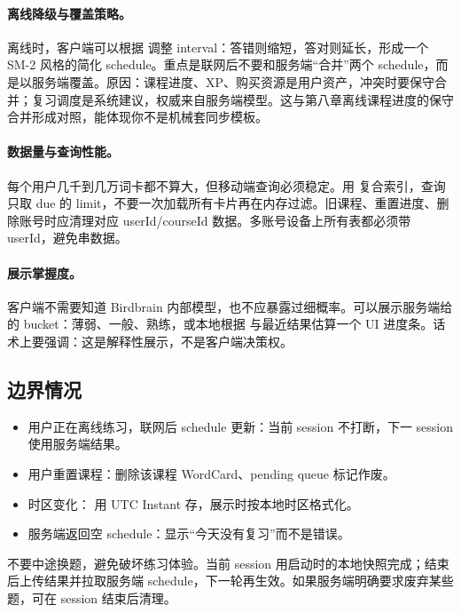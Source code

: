 \paragraph{离线降级与覆盖策略。} 离线时，客户端可以根据  调整 interval：答错则缩短，答对则延长，形成一个 SM-2 风格的简化 schedule。重点是联网后不要和服务端“合并”两个 schedule，而是以服务端覆盖。原因：课程进度、XP、购买资源是用户资产，冲突时要保守合并；复习调度是系统建议，权威来自服务端模型。\srcinferred 这与第八章离线课程进度的保守合并形成对照，能体现你不是机械套同步模板。

\paragraph{数据量与查询性能。} 每个用户几千到几万词卡都不算大，但移动端查询必须稳定。\srcinferred 用  复合索引，查询只取 due 的 limit，不要一次加载所有卡片再在内存过滤。旧课程、重置进度、删除账号时应清理对应 userId/courseId 数据。多账号设备上所有表都必须带 userId，避免串数据。

\paragraph{展示掌握度。} \srcinferred 客户端不需要知道 Birdbrain 内部模型，也不应暴露过细概率。可以展示服务端给的 bucket：薄弱、一般、熟练，或本地根据  与最近结果估算一个 UI 进度条。话术上要强调：这是解释性展示，不是客户端决策权。

\subsection{边界情况}

\begin{itemize}
  \item 用户正在离线练习，联网后 schedule 更新：当前 session 不打断，下一 session 使用服务端结果。
  \item 用户重置课程：删除该课程 WordCard、pending queue 标记作废。
  \item 时区变化： 用 UTC Instant 存，展示时按本地时区格式化。
  \item 服务端返回空 schedule：显示“今天没有复习”而不是错误。
\end{itemize}

\begin{followup}
不要中途换题，避免破坏练习体验。当前 session 用启动时的本地快照完成；结束后上传结果并拉取服务端 schedule，下一轮再生效。如果服务端明确要求废弃某些题，可在 session 结束后清理。
\end{followup}

